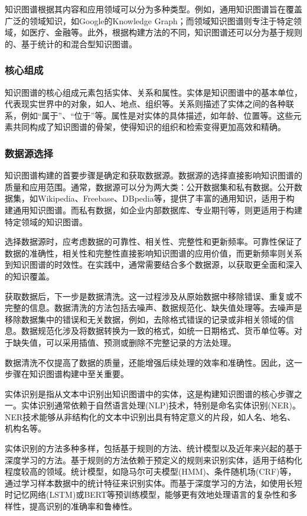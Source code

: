 知识图谱根据其内容和应用领域可以分为多种类型。例如，通用知识图谱旨在覆盖广泛的领域知识，如Google的Knowledge Graph；而领域知识图谱则专注于特定领域，如医疗、金融等。此外，根据构建方法的不同，知识图谱还可以分为基于规则的、基于统计的和混合型知识图谱。

\subsubsection{核心组成} 
知识图谱的核心组成元素包括实体、关系和属性。实体是知识图谱中的基本单位，代表现实世界中的对象，如人、地点、组织等。关系则描述了实体之间的各种联系，例如“属于”、“位于”等。属性是对实体的具体描述，如年龄、位置等。这些元素共同构成了知识图谱的骨架，使得知识的组织和检索变得更加高效和精确。

\subsubsection{数据源选择} 
知识图谱构建的首要步骤是确定和获取数据源。数据源的选择直接影响知识图谱的质量和应用范围。通常，数据源可以分为两大类：公开数据集和私有数据。公开数据集，如Wikipedia、Freebase、DBpedia等，提供了丰富的通用知识，适用于构建通用知识图谱。而私有数据，如企业内部数据库、专业期刊等，则更适用于构建特定领域的知识图谱。

选择数据源时，应考虑数据的可靠性、相关性、完整性和更新频率。可靠性保证了数据的准确性，相关性和完整性直接影响知识图谱的应用价值，而更新频率则关系到知识图谱的时效性。在实践中，通常需要结合多个数据源，以获取更全面和深入的知识覆盖。

获取数据后，下一步是数据清洗。这一过程涉及从原始数据中移除错误、重复或不完整的信息。数据清洗的方法包括去噪声、数据规范化、缺失值处理等。去噪声是移除数据集中的错误和无关数据，例如，去除格式错误的记录或非相关领域的信息。数据规范化涉及将数据转换为一致的格式，如统一日期格式、货币单位等。对于缺失值，可以采用插值、预测或删除不完整记录的方法处理。

数据清洗不仅提高了数据的质量，还能增强后续处理的效率和准确性。因此，这一步骤在知识图谱构建中至关重要。

实体识别是指从文本中识别出知识图谱中的实体，这是构建知识图谱的核心步骤之一。实体识别通常依赖于自然语言处理\textrm{(NLP)}技术，特别是命名实体识别\textrm{(NER)}。NER技术能够从非结构化的文本中识别出具有特定意义的片段，如人名、地名、机构名等。

实体识别的方法多种多样，包括基于规则的方法、统计模型以及近年来兴起的基于深度学习的方法。基于规则的方法依赖于预定义的规则来识别实体，适用于结构化程度较高的领域。统计模型，如隐马尔可夫模型\textrm{(HMM)}、条件随机场\textrm{(CRF)}等，通过学习样本数据中的统计特征来识别实体。而基于深度学习的方法，如使用长短时记忆网络\textrm{(LSTM)}或\textrm{BERT}等预训练模型，能够更有效地处理语言的复杂性和多样性，提高识别的准确率和鲁棒性。

